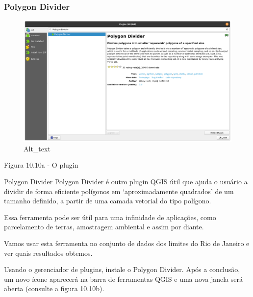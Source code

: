 \documentclass[
]{book}
\begin{document}
\hypertarget{polygon-divider}{%
\subsubsection{\texorpdfstring{\textbf{Polygon Divider}}{Polygon Divider}}\label{polygon-divider}}

\begin{figure}
\centering
\includegraphics{media/modulo10/fig1010_a.png}
\caption{Alt\_text}
\end{figure}

Figura 10.10a - O plugin

Polygon Divider Polygon Divider é outro plugin QGIS útil que ajuda o usuário a dividir de forma eficiente polígonos em `aproximadamente quadrados' de um tamanho definido, a partir de uma camada vetorial do tipo polígono.

Essa ferramenta pode ser útil para uma infinidade de aplicações, como parcelamento de terras, amostragem ambiental e assim por diante.

Vamos usar esta ferramenta no conjunto de dados dos limites do Rio de Janeiro e ver quais resultados obtemos.

Usando o gerenciador de plugins, instale o Polygon Divider. Após a conclusão, um novo ícone aparecerá na barra de ferramentas QGIS e uma nova janela será aberta (consulte a figura 10.10b).
\end{document}
